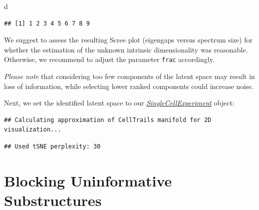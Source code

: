 \documentclass[]{book}
\newenvironment{Shaded}{\begin{snugshade}}{\end{snugshade}}
\newcommand{\KeywordTok}[1]{\textcolor[rgb]{0.13,0.29,0.53}{\textbf{#1}}}
\newcommand{\StringTok}[1]{\textcolor[rgb]{0.31,0.60,0.02}{#1}}
\newcommand{\OperatorTok}[1]{\textcolor[rgb]{0.81,0.36,0.00}{\textbf{#1}}}
\newcommand{\NormalTok}[1]{#1}
\theoremstyle{definition}
\theoremstyle{definition}
\theoremstyle{definition}
\theoremstyle{remark}
\begin{document}
\begin{Shaded}
\begin{Highlighting}[]
\NormalTok{d}
\end{Highlighting}
\end{Shaded}

\begin{verbatim}
## [1] 1 2 3 4 5 6 7 8 9
\end{verbatim}

We suggest to assess the resulting Scree plot (eigengaps versus spectrum
size) for whether the estimation of the unknown intrinsic dimensionality
was reasonable. Otherwise, we recommend to adjust the parameter
\texttt{frac} accordingly.

\emph{Please note} that considering too few components of the latent
space may result in loss of information, while selecting lower ranked
components could increase noise.

Next, we set the identified latent space to our
\emph{\href{http://bioconductor.org/packages/SingleCellExperiment}{SingleCellExperiment}}
object:

\begin{Shaded}
\end{Shaded}

\begin{verbatim}
## Calculating approximation of CellTrails manifold for 2D visualization...
\end{verbatim}

\begin{verbatim}
## Used tSNE perplexity: 30
\end{verbatim}

\section{Blocking Uninformative
Substructures}\label{blocking-uninformative-substructures}
\end{document}
